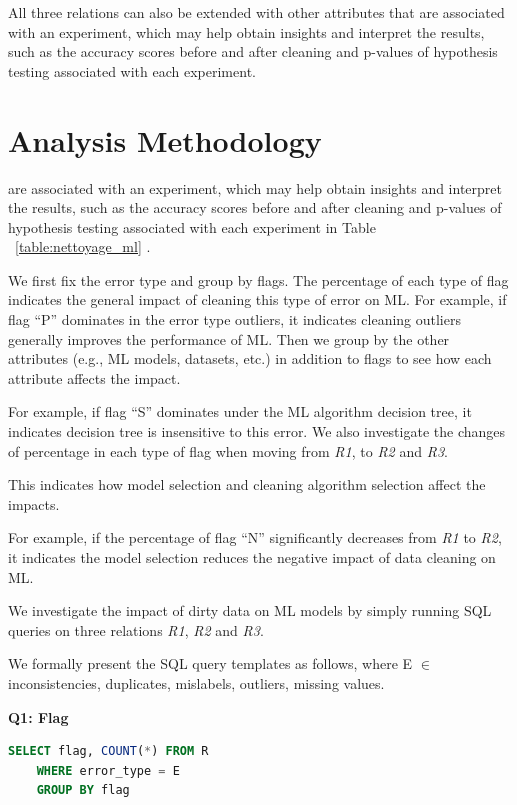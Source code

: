 All three relations can also be extended with other attributes that are associated with an experiment, which may help obtain insights
and interpret the results, such as the accuracy scores before and
after cleaning and p-values of hypothesis testing associated with
each experiment.


\section{Analysis Methodology}\label{sec:analysis-methodology}

are associated with an experiment, which may help obtain insights
and interpret the results, such as the accuracy scores before and
after cleaning and p-values of hypothesis testing associated with
each experiment in Table  ~\ref{table:nettoyage_ml} . 

We first fix the error type and group by flags. The percentage of each type of flag indicates the general impact of cleaning this type of error on ML. For example,
if flag “P” dominates in the error type outliers, it indicates cleaning outliers generally improves the performance of ML. Then we
group by the other attributes (e.g., ML models, datasets, etc.) in addition to flags to see how each attribute affects the impact. 

For example, if flag “S” dominates under the ML algorithm decision tree, it indicates decision tree is insensitive to this error.
We also investigate the changes of percentage in each type of flag when moving from \textit{R1}, to \textit{R2} and \textit{R3}. 

This indicates how model selection and cleaning algorithm selection affect the impacts. 

For example, if the percentage of flag “N” significantly decreases from
\textit{R1} to \textit{R2}, it indicates the model selection reduces the negative impact of data cleaning on ML.

We investigate the impact of dirty data on ML models by simply running SQL queries on three relations \textit{R1}, \textit{R2} and \textit{R3}. 

We formally present the SQL query templates as follows, where E $\in$ {inconsistencies, duplicates, mislabels, outliers, missing values}.

\textbf{Q1: Flag}
\begin{lstlisting}[language=SQL, caption=Q1: Flag]
	SELECT flag, COUNT(*) FROM R 
	WHERE error_type = E 
	GROUP BY flag
\end{lstlisting}

